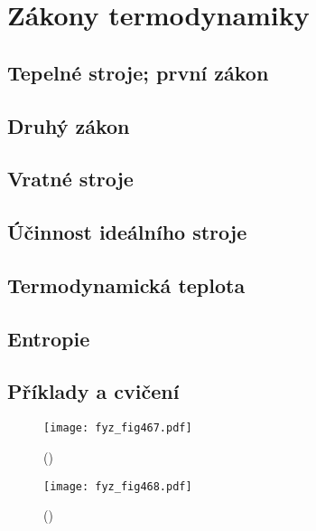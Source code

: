 \chapter{Zákony termodynamiky}\label{fyz:IchapXLIV}
\minitoc
  \section{Tepelné stroje; první zákon}\label{fyz:IchapXLIVsecI}
  \section{Druhý zákon}\label{fyz:IchapXLIVsecII}
  \section{Vratné stroje}\label{fyz:IchapXLIVsecIII}
  \section{Účinnost ideálního stroje}\label{fyz:IchapXLIVsecIV}
  \section{Termodynamická teplota}\label{fyz:IchapXLIVsecV}
  \section{Entropie}\label{fyz:IchapXLIVsecVI}
  \section{Příklady a cvičení}\label{fyz:IchapXLIVsecVII}

    \begin{figure}[ht!] %
      \centering
      \texttt{[image: fyz\_fig467.pdf]}
      \caption{ 
               (\cite[s.~707]{Feynman01})}
      \label{fyz_fig467}
    \end{figure}

    \begin{figure}[ht!] %
      \centering
      \texttt{[image: fyz\_fig468.pdf]}
      \caption{ 
               (\cite[s.~707]{Feynman01})}
      \label{fyz_fig468}
    \end{figure}

